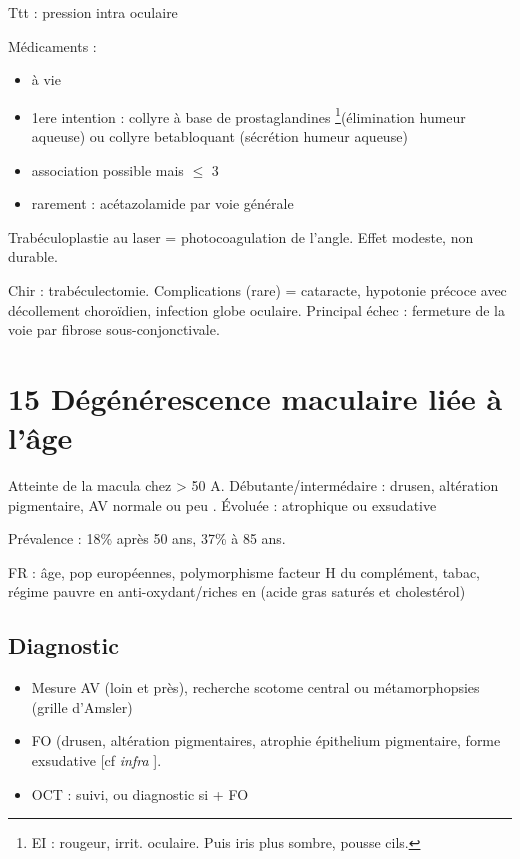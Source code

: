 \documentclass[11pt]{article}
\begin{document}
Ttt : \dec pression intra oculaire

Médicaments :
\begin{itemize}
\item à vie
\item 1ere intention : collyre à base de prostaglandines \footnote{EI : rougeur, irrit. oculaire. Puis iris plus sombre, \inc pousse cils.}(\inc élimination humeur
aqueuse) ou collyre betabloquant
(\dec sécrétion humeur aqueuse)
\item association possible mais \(\le\) 3
\item rarement : acétazolamide par voie générale
\end{itemize}

Trabéculoplastie au laser = photocoagulation de l'angle. Effet modeste, non durable.

Chir : trabéculectomie. Complications (rare) = cataracte, hypotonie précoce
avec décollement choroïdien, infection globe oculaire. Principal échec :
fermeture de la voie par fibrose sous-conjonctivale.

\section{15 Dégénérescence maculaire liée à l'âge}
\label{sec:orga2594ca}
Atteinte de la macula chez > 50 A. Débutante/intermédaire : drusen, altération
pigmentaire, AV normale ou peu \dec. Évoluée : atrophique ou exsudative

Prévalence : 18\% après 50 ans, 37\% à 85 ans.

FR : âge, pop européennes, polymorphisme facteur H du complément, tabac, régime
pauvre en anti-oxydant/riches en (acide gras saturés et cholestérol)

\subsection{Diagnostic}
\label{sec:org0d48c70}
\begin{itemize}
\item Mesure AV (loin et près), recherche scotome central ou métamorphopsies (grille d'Amsler)
\item FO (drusen, altération pigmentaires, atrophie épithelium pigmentaire, forme
exsudative [cf \emph{infra} ].
\item OCT : suivi, ou diagnostic si + FO
\end{itemize}
\end{document}
